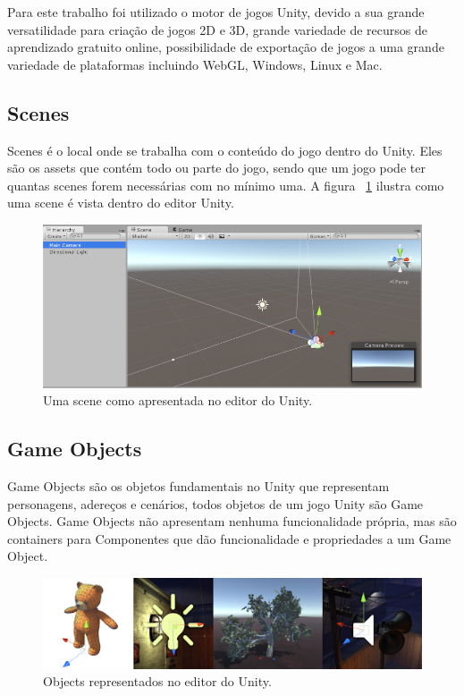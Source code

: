 \documentclass[
	12pt,				%
	openright,			%
	twoside,			%
	a4paper,			%
	english,			%
	french,				%
	spanish,			%
	brazil				%
	]{abntex2}
\begin{document}
	Para este trabalho foi utilizado o motor de jogos Unity, devido a sua grande versatilidade para criação de jogos 2D e 3D, grande variedade de recursos de aprendizado gratuito online,  possibilidade de exportação de jogos a uma grande variedade de plataformas incluindo WebGL, Windows, Linux e Mac. 

\subsection{Scenes}

Scenes é o local onde se trabalha com o conteúdo do jogo dentro do Unity. Eles são os assets que contém todo ou parte do jogo, sendo que um jogo pode ter quantas scenes forem necessárias com no mínimo uma. A figura ~\ref{fig:scene1} ilustra como uma scene é vista dentro do editor Unity.

\begin{figure}[h!]
  \includegraphics[width=\linewidth]{scene.jpg}
  \caption{Uma scene como apresentada no editor do Unity.}
  \label{fig:scene1}
\end{figure}
\pagebreak
\subsection{Game Objects}

Game Objects são os objetos fundamentais no Unity que representam personagens, adereços e cenários, todos objetos de um jogo Unity são Game Objects. Game Objects não apresentam nenhuma funcionalidade própria, mas são containers para Componentes que dão funcionalidade e propriedades a um Game Object.

\begin{figure}[h!]
  \includegraphics[width=\linewidth]{object.jpg}
  \caption{Objects representados no editor do Unity.}
  \label{fig:objects}
\end{figure}
\end{document}
